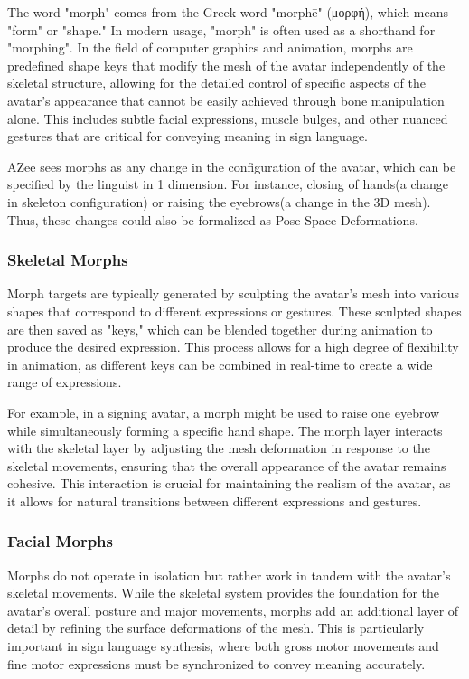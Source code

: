 \documentclass[../../main.tex]{subfiles}
\begin{document}
The word "morph" comes from the Greek word "morphē" (μορφή), which means "form" or "shape." In modern usage, "morph" is often used as a shorthand for "morphing". In the field of computer graphics and animation, morphs are predefined shape keys that modify the mesh of the avatar independently of the skeletal structure, allowing for the detailed control of specific aspects of the avatar's appearance that cannot be easily achieved through bone manipulation alone. This includes subtle facial expressions, muscle bulges, and other nuanced gestures that are critical for conveying meaning in sign language.

AZee sees morphs as any change in the configuration of the avatar, which can be specified by the linguist in 1 dimension. For instance, closing of hands(a change in skeleton configuration) or raising the eyebrows(a change in the 3D mesh). Thus, these changes could also be formalized as Pose-Space Deformations.

\subsubsection{Skeletal Morphs}

Morph targets are typically generated by sculpting the avatar's mesh into various shapes that correspond to different expressions or gestures. These sculpted shapes are then saved as "keys," which can be blended together during animation to produce the desired expression. This process allows for a high degree of flexibility in animation, as different keys can be combined in real-time to create a wide range of expressions.

For example, in a signing avatar, a morph might be used to raise one eyebrow while simultaneously forming a specific hand shape. The morph layer interacts with the skeletal layer by adjusting the mesh deformation in response to the skeletal movements, ensuring that the overall appearance of the avatar remains cohesive. This interaction is crucial for maintaining the realism of the avatar, as it allows for natural transitions between different expressions and gestures.

\subsubsection{Facial Morphs}

Morphs do not operate in isolation but rather work in tandem with the avatar's skeletal movements. While the skeletal system provides the foundation for the avatar's overall posture and major movements, morphs add an additional layer of detail by refining the surface deformations of the mesh. This is particularly important in sign language synthesis, where both gross motor movements and fine motor expressions must be synchronized to convey meaning accurately.
\end{document}
